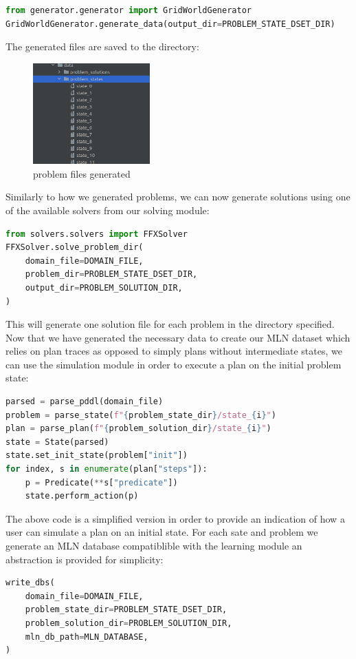 \begin{lstlisting}[language=Python]
from generator.generator import GridWorldGenerator
GridWorldGenerator.generate_data(output_dir=PROBLEM_STATE_DSET_DIR)
\end{lstlisting}

The generated files are saved to the directory:
\begin{figure}[h]
 \centering
 \includegraphics[width=0.4\textwidth]{images/code/problem_states}
 \caption{problem files generated}
 \label{fig:problem files}
\end{figure}

Similarly to how we generated problems, we can now generate solutions using one of the available solvers from our solving module:

\begin{lstlisting}[language=Python]
from solvers.solvers import FFXSolver
FFXSolver.solve_problem_dir(
    domain_file=DOMAIN_FILE,
    problem_dir=PROBLEM_STATE_DSET_DIR,
    output_dir=PROBLEM_SOLUTION_DIR,
)
\end{lstlisting}
This will generate one solution file for each problem in the directory specified.
Now that we have generated the necessary data to create our MLN dataset which relies on plan traces as opposed to simply plans without intermediate states, we can use the simulation module in order to execute a plan on the initial problem state:
\begin{lstlisting}[language=Python]
parsed = parse_pddl(domain_file)
problem = parse_state(f"{problem_state_dir}/state_{i}")
plan = parse_plan(f"{problem_solution_dir}/state_{i}")
state = State(parsed)
state.set_init_state(problem["init"])
for index, s in enumerate(plan["steps"]):
    p = Predicate(**s["predicate"])
    state.perform_action(p)
\end{lstlisting}

The above code is a simplified version in order to provide an indication of how a user can simulate a plan on an initial state.
For each sate and problem we generate an MLN database compatiblible with the learning module an abstraction is provided for simplicity:
\begin{lstlisting}[language=Python]
write_dbs(
    domain_file=DOMAIN_FILE,
    problem_state_dir=PROBLEM_STATE_DSET_DIR,
    problem_solution_dir=PROBLEM_SOLUTION_DIR,
    mln_db_path=MLN_DATABASE,
)
\end{lstlisting}

